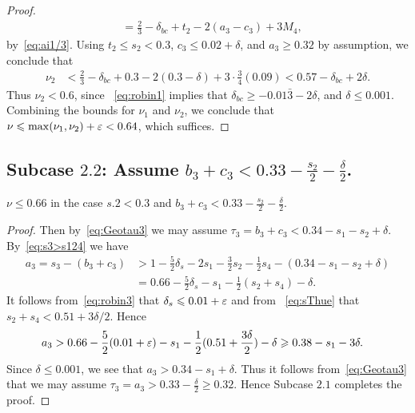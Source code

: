 \begin{proof}
\begin{align*}
  & = \frac{2}{3} -\delta_{bc}+ t_2 - 2(a_3-c_3) +3M_4,
  \end{align*}
  by~\eqref{eq:ai1/3}. Using
  $t_2\le s_2< 0.3$, $c_3\le 0.02+\delta$, and $a_3\ge 0.32$ by assumption, we conclude that
  \begin{align*}
  \nu_2
  & < \frac{2}{3} -\delta_{bc} + 0.3 - 2(0.3-\delta) + 3\cdot\frac{3}{4}(0.09) <
  0.57-\delta_{bc}+2\delta.
  \end{align*}
  Thus $\nu_2<0.6$, since
  ~\eqref{eq:robin1} implies that $\delta_{bc}\geq -0.01\bar3-2\delta$, and $\delta\leq 0.001$. Combining the bounds for $\nu_1$ and $\nu_2$, we conclude that $\nu \leqslant \max(\nu_1,\nu_2)+\varepsilon<0.64$, which suffices.
\end{proof}


\subsection*{Subcase $\mathbf{2.2}$: Assume
$b_3+c_3<0.33-\frac{s_2}{2}-\frac{\delta}{2}$.}

\begin{lemma}\label{lem:Subcase2.2}
  \leanok
  $\nu \leq 0.66$ in the case $s.2 < 0.3$ and $b_3+c_3<0.33-\frac{s_2}{2}-\frac{\delta}{2}$.
\end{lemma}
\begin{proof}
  \leanok
  Then by~\eqref{eq:Geotau3} we may assume $\tau_3=b_3+c_3<0.34-s_1-s_2+\delta$. By~\eqref{eq:s3>s124} we have
  \begin{align*}
  a_3 = s_3 - (b_3+c_3) &> 1 - \frac{5}{2}\delta_s - 2s_1 - \frac{3}{2}s_2 - \frac{1}{2}s_4 - (0.34-s_1-s_2+ \delta)\\
  & = 0.66- \frac{5}{2}\delta_s - s_1 - \frac{1}{2}(s_2+s_4)-\delta.
  \end{align*}
  It follows from~\eqref{eq:robin3} that $\delta_s\leqslant 0.01+\varepsilon$ and from
  ~\eqref{eq:sThue} that $s_2+s_4<0.51+3\delta/2$. Hence
  \begin{align*}
  a_3
  & > 0.66- \frac{5}{2}(0.01+\varepsilon) - s_1 - \frac{1}{2}(0.51+\frac{3\delta}{2}) - \delta \geqslant 0.38-s_1- 3\delta.
  \end{align*}
  Since $\delta\le 0.001$, we see that $a_3> 0.34-s_1+ \delta$.
  Thus it follows from~\eqref{eq:Geotau3} that we may assume $\tau_3=a_3>0.33-\frac{\delta}{2}\geq 0.32$. Hence Subcase
  $\mathbf{2.1}$ completes the proof.
\end{proof}



